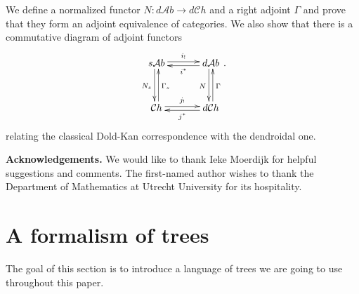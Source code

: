 \documentclass[a4paper]{amsart}
\theoremstyle{plain}
\theoremstyle{definition}
\theoremstyle{remark}
\newcommand{\A}{\mathcal{A}b}
\newcommand{\Ch}{\mathcal{C}h}
\newcommand{\dCh}{d\mathcal{C}h}
\newcommand{\dAb}{d\mathcal{A}b}
\numberwithin{equation}{section}
\numberwithin{figure}{section}
\begin{document}
We define a normalized functor $N\colon d\A\longrightarrow d\Ch$ and a right adjoint $\Gamma$ and prove that they form an adjoint equivalence of
categories. We also show that there is a commutative diagram of adjoint functors
$$
\xymatrix@R+3mm@C+3mm{ s\A\ar@<2pt>[r]^-{i_!}\ar@<-2pt>[d]_{N_s} &\dAb\ar@<-2pt>[d]_N\ar@<2pt>[l]^-{i^*} \\
\Ch\ar@<2pt>[r]^-{j_!}\ar@<-2pt>[u]_{\Gamma_s}&\dCh\ar@<2pt>[l]^-{j^*}\ar@<-2pt>[u]_{\Gamma}}.
$$
relating the classical Dold-Kan correspondence with the dendroidal one.

\bigskip
\noindent\textbf{Acknowledgements.} We would like to thank Ieke
Moerdijk for helpful suggestions and comments. The first-named
author wishes to thank the Department of Mathematics at Utrecht
University for its hospitality.
\section{A formalism of trees}
The goal of this section is to introduce a language of trees we are
going to use throughout this paper.
\end{document}
